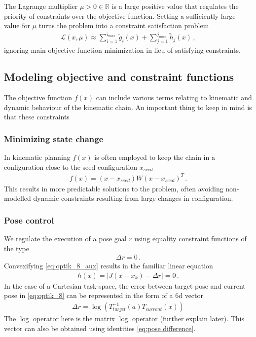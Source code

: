 \documentclass[times, utf8, diplomski, english]{fer}
\begin{document}
The Lagrange multiplier $\mu > 0 \in \mathbb{R}$ is a large positive value that regulates the priority of constraints over the objective function. Setting a sufficiently large value for $\mu$ turns the problem into a constraint satisfaction problem
\begin{align}
\label{optik_6}
\mathcal{L}(x,\mu) \approx \sum\limits_{i = 1}^{i_{max}}{\tilde{g}_{i}\left(x\right)}
+ \sum\limits_{j = 1}^{j_{max}}{\tilde{h}_{j}\left(x\right)}\, ,
\end{align}
ignoring main objective function minimization in lieu of satisfying constraints.
\subsection{Modeling objective and constraint functions}
The objective function $f\left(x\right)$ can include various terms relating to kinematic and dynamic behaviour of the kinematic chain.
An important thing to keep in mind is that these constraints
\subsubsection{Minimizing state change}
In kinematic planning $f\left(x\right)$ is often employed to keep the chain in a configuration close to the seed configuration $x_{seed}$
\begin{align}
\label{optik_7}
f\left(x\right) = \left(x - x_{seed}\right)W\left(x - x_{seed}\right)^{T}\, .
\end{align}
This results in more predictable solutions to the problem, often avoiding non-modelled dynamic constraints resulting from large changes in configuration.
\subsubsection{Pose control}
We regulate the execution of a pose goal $r$ using equality constraint functions of the type
\begin{align}
\label{eq:optik_8_aux}
\Delta r = 0\, .
\end{align}
Convexifying \eqref{eq:optik_8_aux} results in the familiar linear equation
\begin{align}
\label{eq:optik_8}
h\left(x\right) = \left\vert J\left(x - x_{k}\right) - \Delta r \right\vert = 0\, .
\end{align}
In the case of a Cartesian task-space, the error between target pose and current pose in \eqref{eq:optik_8} can be represented in the form of a 6d vector
\begin{align}
\Delta r = \log\left(T_{target}^{-1}\left(a\right) T_{current}\left(x\right)\right)
\end{align}
The $\log$ operator here is the matrix $\log$ operator (further explain later).
This vector can also be obtained using identities \eqref{eq:pose difference}.
\end{document}
